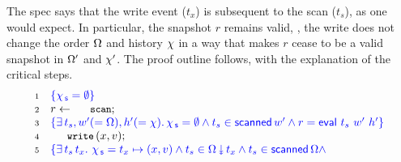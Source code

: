 The spec says that the write event ($t_x$) is subsequent to the scan
($t_s$), as one would expect. In particular, the snapshot $r$ remains
valid, \ie, the write does not change the order $\Omega$ and
history $\chi$ in a way that makes $r$ cease to be a valid snapshot
in $\Omega'$ and $\chi'$. The proof outline follows, with the
explanation of the critical steps.
%
\[
\!\begin{array}{r l}
 \num{1} & \specK{\{ \histS = \hempty \}}\\ %
 \num{2} & r \tbnd \esc{scan};\\
 \num{3} & \specK{\{ \exists\, t_s, w'(=\stableorder), h'(=\hist)\ldot 
       \histS = \hempty \wedge 
        t_s \in \scanned{w'}  \wedge r = \eval\ t_s\ w'\ h'\}}\\
 \num{4} & \esc{write}\, (x,v);\\
 \num{5} & \specK{\{ \exists\, t_s\, t_x\ldot\,
               \histS = t_x \hpts (x, v) \wedge t_s \in \sideal{\stableorder}{t_x} \wedge t_s \in \scanned{\stableorder} \wedge
}
\end{array}\]
